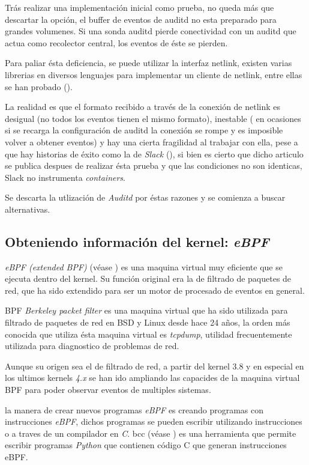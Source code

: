 Trás realizar una implementación inicial como prueba, no queda más que descartar la opción, el buffer de eventos de auditd no esta preparado para grandes volumenes.
Si una sonda auditd pierde conectividad con un auditd que actua como recolector central, los eventos de éste se pierden.

Para paliar ésta deficiencia, se puede utilizar la interfaz netlink, existen varias librerias en diversos lenguajes para implementar un cliente de netlink, entre ellas
se han probado (\cite{netlink-glnpy,netlink-audit-go,netlink-go-audit}).

La realidad es que el formato recibido a través de la conexión de netlink es desigual (no todos los eventos tienen el mismo formato), inestable ( en ocasiones si se recarga la configuración de auditd la conexión se rompe y es imposible volver a obtener eventos) y hay una cierta fragilidad al trabajar con ella, pese a que hay historias de éxito
como la de \emph{Slack} (\cite{netlink-slack-success}), si bien es cierto que dicho articulo se publica despues de realizar ésta prueba y que las condiciones no son identicas, Slack no instrumenta \emph{containers}.

Se descarta la utlización de \emph{Auditd} por éstas razones y se comienza a buscar alternativas.

\subsection{Obteniendo información del kernel: \emph{eBPF}}
\label{subsec:ebpf}

\emph{eBPF (extended BPF)} (véase \cite{ebpf-brendan-gregg,ebpf-series}) es una maquina virtual muy eficiente que se ejecuta dentro del kernel. Su función original era la de filtrado de paquetes de red, que ha sido
extendido para ser un motor de procesado de eventos en general.

BPF \emph{Berkeley packet filter} es una maquina virtual que ha sido utilizada para filtrado de paquetes de red en BSD y Linux desde hace 24 años, la orden
más conocida que utiliza ésta maquina virtual es \emph{tcpdump}, utilidad frecuentemente utilizada para diagnostico de problemas de red.

Aunque su origen sea el de filtrado de red, a partir del kernel 3.8 y en especial en los ultimos kernels \emph{4.x} se han ido ampliando las capacides de la maquina virtual BPF para poder
observar eventos de multiples sistemas.

la manera de crear nuevos programas \emph{eBPF} es creando programas con instrucciones \emph{eBPF}, dichos programas se pueden escribir utilizando
instrucciones o a traves de un compilador en \emph{C}. bcc (véase \cite{bcc-project}) es una herramienta que permite escribir programas \emph{Python} que contienen código C que generan 
instrucciones eBPF.

